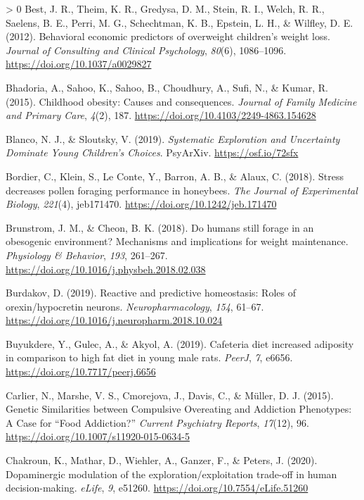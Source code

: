 \documentclass[
]{/home/nicoluarte/Downloads/templates/PNAS-template-main.tex}
\newlength{\cslhangindent}
\newenvironment{CSLReferences}[3] %
 {%
  \setlength{\parindent}{0pt}
  \ifodd #1 \everypar{\setlength{\hangindent}{\cslhangindent}}\ignorespaces\fi
  \ifnum #2 > 0
  \setlength{\parskip}{#2\baselineskip}
  \fi
 }%
 {}
\begin{document}
\begin{CSLReferences}{1}{0}
\leavevmode\hypertarget{ref-8QS2B4AF}{}%
Best, J. R., Theim, K. R., Gredysa, D. M., Stein, R. I., Welch, R. R.,
Saelens, B. E., Perri, M. G., Schechtman, K. B., Epstein, L. H., \&
Wilfley, D. E. (2012). Behavioral economic predictors of overweight
children's weight loss. \emph{Journal of Consulting and Clinical
Psychology}, \emph{80}(6), 1086--1096.
\url{https://doi.org/10.1037/a0029827}

\leavevmode\hypertarget{ref-BFYKZGMM}{}%
Bhadoria, A., Sahoo, K., Sahoo, B., Choudhury, A., Sufi, N., \& Kumar,
R. (2015). Childhood obesity: Causes and consequences. \emph{Journal of
Family Medicine and Primary Care}, \emph{4}(2), 187.
\url{https://doi.org/10.4103/2249-4863.154628}

\leavevmode\hypertarget{ref-AFIWCGVS}{}%
Blanco, N. J., \& Sloutsky, V. (2019). \emph{Systematic Exploration and
Uncertainty Dominate Young Children's Choices}. PsyArXiv.
\url{https://osf.io/72sfx}

\leavevmode\hypertarget{ref-PN23NXIS}{}%
Bordier, C., Klein, S., Le Conte, Y., Barron, A. B., \& Alaux, C.
(2018). Stress decreases pollen foraging performance in honeybees.
\emph{The Journal of Experimental Biology}, \emph{221}(4), jeb171470.
\url{https://doi.org/10.1242/jeb.171470}

\leavevmode\hypertarget{ref-VTI2FVJG}{}%
Brunstrom, J. M., \& Cheon, B. K. (2018). Do humans still forage in an
obesogenic environment? Mechanisms and implications for weight
maintenance. \emph{Physiology \& Behavior}, \emph{193}, 261--267.
\url{https://doi.org/10.1016/j.physbeh.2018.02.038}

\leavevmode\hypertarget{ref-IQWZPMP7}{}%
Burdakov, D. (2019). Reactive and predictive homeostasis: Roles of
orexin/hypocretin neurons. \emph{Neuropharmacology}, \emph{154}, 61--67.
\url{https://doi.org/10.1016/j.neuropharm.2018.10.024}

\leavevmode\hypertarget{ref-9I3RBWWB}{}%
Buyukdere, Y., Gulec, A., \& Akyol, A. (2019). Cafeteria diet increased
adiposity in comparison to high fat diet in young male rats.
\emph{PeerJ}, \emph{7}, e6656. \url{https://doi.org/10.7717/peerj.6656}

\leavevmode\hypertarget{ref-GDQBDJJ2}{}%
Carlier, N., Marshe, V. S., Cmorejova, J., Davis, C., \& Müller, D. J.
(2015). Genetic Similarities between Compulsive Overeating and Addiction
Phenotypes: A Case for {``Food Addiction?''} \emph{Current Psychiatry
Reports}, \emph{17}(12), 96.
\url{https://doi.org/10.1007/s11920-015-0634-5}

\leavevmode\hypertarget{ref-8FIHXB6G}{}%
Chakroun, K., Mathar, D., Wiehler, A., Ganzer, F., \& Peters, J. (2020).
Dopaminergic modulation of the exploration/exploitation trade-off in
human decision-making. \emph{eLife}, \emph{9}, e51260.
\url{https://doi.org/10.7554/eLife.51260}


\end{CSLReferences}
\end{document}
